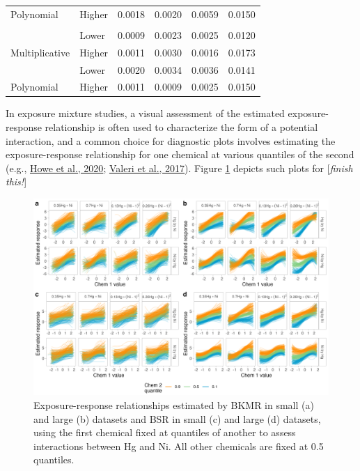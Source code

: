 \documentclass[12pt, twoside]{amherstthesis}
\begin{document}
\begin{table}
\begin{tabular}[t]{llcccc}
\multirow{-2}{*}{\raggedright\arraybackslash \hspace{1em}Polynomial} & Higher & 0.0018 & 0.0020 & 0.0059 & 0.0150\\
\addlinespace
\addlinespace[0.3em]
\multicolumn{6}{l}{\textbf{Ni-Co}}\\
 & Lower & 0.0009 & 0.0023 & 0.0025 & 0.0120\\

\multirow{-2}{*}{\raggedright\arraybackslash \hspace{1em}Multiplicative} & Higher & 0.0011 & 0.0030 & 0.0016 & 0.0173\\
\addlinespace
 & Lower & 0.0020 & 0.0034 & 0.0036 & 0.0141\\

\multirow{-2}{*}{\raggedright\arraybackslash \hspace{1em}Polynomial} & Higher & 0.0011 & 0.0009 & 0.0025 & 0.0150\\
\bottomrule
\end{tabular}
\end{table}
In exposure mixture studies, a visual assessment of the estimated exposure-response relationship is often used to characterize the form of a potential interaction, and a common choice for diagnostic plots involves estimating the exposure-response relationship for one chemical at various quantiles of the second (e.g., \protect\hyperlink{ref-howe_prenatal_2020}{Howe et al., 2020}; \protect\hyperlink{ref-valeri_joint_2017}{Valeri et al., 2017}). Figure \ref{fig:hgnibiv} depicts such plots for {[}\emph{finish this!}{]}
\begin{figure}

{\centering \includegraphics[width=1\linewidth]{figures/ch4_hgni_biv} 

}

\caption{Exposure-response relationships estimated by BKMR in small (a) and large (b) datasets and BSR in small (c) and large (d) datasets, using the first chemical fixed at quantiles of another to assess interactions between Hg and Ni. All other chemicals are fixed at 0.5 quantiles.}\label{fig:hgnibiv}
\end{figure}
\end{document}
